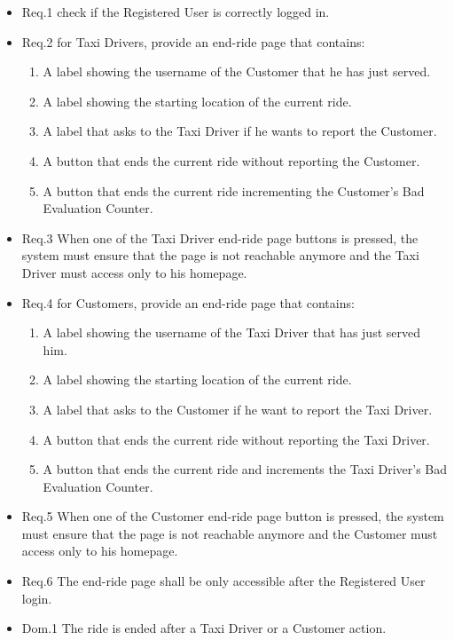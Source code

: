 				\begin{itemize}
					\item \lbrack Req.1\rbrack \label{sec:fr1_g8} check if the Registered User is correctly logged in.
					\item \lbrack Req.2\rbrack \label{sec:fr2_g8} for Taxi Drivers, provide an end-ride page that contains:
						\begin{enumerate}
							\item A label showing the username of the Customer that he has just served.
							\item A label showing the starting location of the current ride.
							\item A label that asks to the Taxi Driver if he wants to report the Customer.
							\item A button that ends the current ride without reporting the Customer.
							\item A button that ends the current ride incrementing the Customer's Bad Evaluation Counter.
						\end{enumerate}
					\item \lbrack Req.3\rbrack \label{sec:fr3_g8} When one of the Taxi Driver end-ride page buttons is pressed, the system must ensure that the page is not reachable anymore and the Taxi Driver must access only to his homepage.
					\\
					\item \lbrack Req.4\rbrack \label{sec:fr4_g8} for Customers, provide an end-ride page that contains:
						\begin{enumerate}
							\item A label showing the username of the Taxi Driver that has just served him.
							\item A label showing the starting location of the current ride.
							\item A label that asks to the Customer if he want to report the Taxi Driver.
							\item A button that ends the current ride without reporting the Taxi Driver.
							\item A button that ends the current ride and increments the Taxi Driver's Bad Evaluation Counter.
						\end{enumerate}
					\item \lbrack Req.5\rbrack \label{sec:fr5_g8} When one of the Customer end-ride page button is pressed, the system must ensure that the page is not reachable anymore and the Customer must access only to his homepage.
					\item \lbrack Req.6\rbrack \label{sec:fr6_g8} The end-ride page shall be only accessible after the Registered User login.
					\item \lbrack Dom.1\rbrack \label{sec:da1_g8} The ride is ended after a Taxi Driver or a Customer action.
				\end{itemize}

